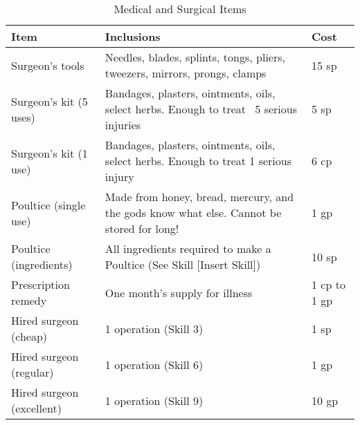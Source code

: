 \documentclass[oneside,11pt,english]{book}
\begin{document}
\begin{table}[hb]
	\centering
	\caption{Medical and Surgical Items}
	\label{tab:Medical and Surgical Items}
	\begin{tabu} spread 0pt {*{3}{X[-1]}}
		Item &Inclusions &Cost\\\toprule
Surgeon’s tools &Needles, blades, splints, tongs, pliers, tweezers, mirrors, prongs, clamps &15 sp\\
Surgeon’s kit (5 uses) &Bandages, plasters, ointments, oils, select herbs. Enough to treat ~5 serious injuries &5 sp\\
Surgeon’s kit (1 use) &Bandages, plasters, ointments, oils, select herbs. Enough to treat 1 serious injury &6 cp\\
Poultice (single use) &Made from honey, bread, mercury, and the gods know what else. Cannot be stored for long! &1 gp\\
Poultice (ingredients) &All ingredients required to make a Poultice (See Skill [Insert Skill]) &10 sp\\
Prescription remedy &One month’s supply for illness &1 cp to 1 gp\\
Hired surgeon (cheap) &1 operation (Skill 3) &1 sp\\
Hired surgeon (regular) &1 operation (Skill 6) &1 gp\\
Hired surgeon (excellent) &1 operation (Skill 9) &10 gp\\
	\end{tabu}
\end{table}
\end{document}
